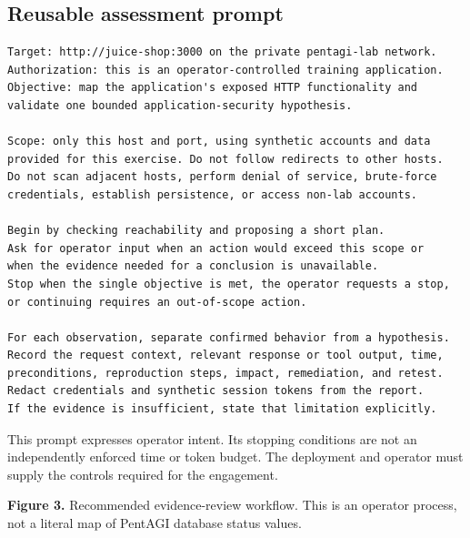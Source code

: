 \documentclass[11pt,letterpaper]{article}
\begin{document}
\subsection{Reusable assessment prompt}
\begin{lstlisting}
Target: http://juice-shop:3000 on the private pentagi-lab network.
Authorization: this is an operator-controlled training application.
Objective: map the application's exposed HTTP functionality and
validate one bounded application-security hypothesis.

Scope: only this host and port, using synthetic accounts and data
provided for this exercise. Do not follow redirects to other hosts.
Do not scan adjacent hosts, perform denial of service, brute-force
credentials, establish persistence, or access non-lab accounts.

Begin by checking reachability and proposing a short plan.
Ask for operator input when an action would exceed this scope or
when the evidence needed for a conclusion is unavailable.
Stop when the single objective is met, the operator requests a stop,
or continuing requires an out-of-scope action.

For each observation, separate confirmed behavior from a hypothesis.
Record the request context, relevant response or tool output, time,
preconditions, reproduction steps, impact, remediation, and retest.
Redact credentials and synthetic session tokens from the report.
If the evidence is insufficient, state that limitation explicitly.
\end{lstlisting}
This prompt expresses operator intent. Its stopping conditions are not an
independently enforced time or token budget. The deployment and operator must
supply the controls required for the engagement.

\begin{center}
\end{center}
{\small\textbf{Figure 3.} Recommended evidence-review workflow. This is an
operator process, not a literal map of PentAGI database status values.}
\end{document}
